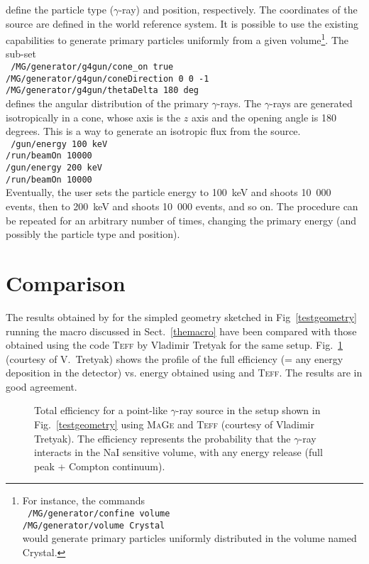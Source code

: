 \documentclass[a4paper,12pt,twoside]{article}
\begin{document}
define the particle type ($\gamma$-ray) and position, respectively. The coordinates of the source 
are defined in the world reference system. It is possible to use the existing \mage capabilities 
to generate primary particles uniformly from a given volume\footnote{
For instance, the commands\\
\texttt{
/MG/generator/confine volume \\
/MG/generator/volume Crystal \\}
would generate primary particles uniformly distributed in the volume named Crystal.}. The sub-set \\
\texttt{
/MG/generator/g4gun/cone\_on true\\
/MG/generator/g4gun/coneDirection 0 0 -1\\
/MG/generator/g4gun/thetaDelta 180 deg\\
}
defines the angular distribution of the primary $\gamma$-rays. The $\gamma$-rays are generated 
isotropically in a cone, whose axis is the $z$ axis and the opening angle is 180 degrees. This is 
a way to generate an isotropic flux from the source. \\
\texttt{
/gun/energy 100 keV\\
/run/beamOn 10000\\
/gun/energy 200 keV\\
/run/beamOn 10000\\}
Eventually, the user sets the particle energy to 100~keV and shoots 10~000 events, then to 200~keV 
and shoots 10~000 events, and so on. The procedure can be repeated for an arbitrary number of times, 
changing the primary energy (and possibly the particle type and position). 
%
\section{Comparison}
The results obtained by \mage for the simpled geometry sketched in Fig~\ref{testgeometry} running 
the macro discussed in Sect.~\ref{themacro} have been compared with those obtained using the 
code \textsc{Teff} by Vladimir Tretyak for the same setup. Fig.~\ref{teff} 
(courtesy of V.~Tretyak) shows 
the profile of the full efficiency (= any energy deposition in the detector) vs. energy obtained 
using \mage and \textsc{Teff}. The results are in good agreement.
\nopagebreak
\begin{figure}[tb]
\begin{center}
\mbox{}
\caption{Total efficiency for a point-like $\gamma$-ray source in the setup shown in 
Fig.~\ref{testgeometry} using \textsc{MaGe} and \textsc{Teff} (courtesy of Vladimir 
Tretyak). The efficiency represents 
the probability that the $\gamma$-ray interacts in the NaI sensitive volume, with any 
energy release (full peak + Compton continuum).}\label{teff}
\end{center}
\end{figure}
%
\end{document}
